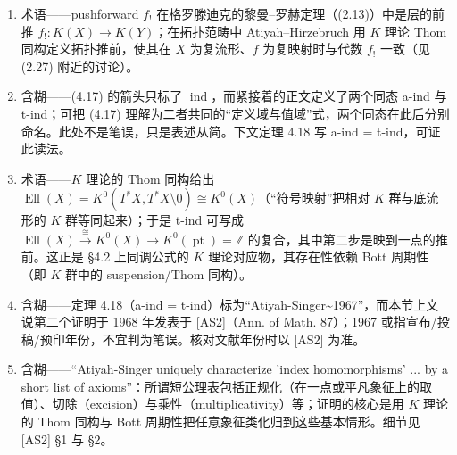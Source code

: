 \documentclass[11pt]{amsart}
\theoremstyle{definition}
\theoremstyle{remark}
\theoremstyle{plain}
\numberwithin{equation}{section}
\renewcommand{\:}{\colon}
\DeclareMathOperator{\pt}{pt}
\newcommand{\ZZ}{{\mathbb Z}}
\DeclareMathOperator{\ind}{ind}
\DeclareMathOperator{\Ell}{Ell}
\begin{document}
\begin{enumerate}[leftmargin=2.2em,itemsep=2pt,topsep=2pt]
  \item 术语——pushforward $f_!$ 在格罗滕迪克的黎曼–罗赫定理（(2.13)）中是层的前推 $f_!:K(X)\to K(Y)$；在拓扑范畴中 Atiyah–Hirzebruch 用 $K$ 理论 Thom 同构定义拓扑推前，使其在 $X$ 为复流形、$f$ 为复映射时与代数 $f_!$ 一致（见 (2.27) 附近的讨论）。
  \item 含糊——(4.17) 的箭头只标了 $\ind$，而紧接着的正文定义了两个同态 a-ind 与 t-ind；可把 (4.17) 理解为二者共同的“定义域与值域”式，两个同态在此后分别命名。此处不是笔误，只是表述从简。下文定理 4.18 写 a-ind = t-ind，可证此读法。
  \item 术语——$K$ 理论的 Thom 同构给出 $\Ell(X)=K^0(T^*X,T^*X\setminus 0)\cong K^0(X)$（“符号映射”把相对 $K$ 群与底流形的 $K$ 群等同起来）；于是 t-ind 可写成 $\Ell(X)\xrightarrow{\cong}K^0(X)\to K^0(\pt)=\ZZ$ 的复合，其中第二步是映到一点的推前。这正是 §4.2 上同调公式的 $K$ 理论对应物，其存在性依赖 Bott 周期性（即 $K$ 群中的 suspension/Thom 同构）。
  \item 含糊——定理 4.18（a-ind = t-ind）标为“Atiyah-Singer\textasciitilde{}1967”，而本节上文说第二个证明于 1968 年发表于 [AS2]（Ann. of Math. 87）；1967 或指宣布/投稿/预印年份，不宜判为笔误。核对文献年份时以 [AS2] 为准。
  \item 含糊——“Atiyah-Singer uniquely characterize 'index homomorphisms' ... by a short list of axioms”：所谓短公理表包括正规化（在一点或平凡象征上的取值）、切除（excision）与乘性（multiplicativity）等；证明的核心是用 $K$ 理论的 Thom 同构与 Bott 周期性把任意象征类化归到这些基本情形。细节见 [AS2] §1 与 §2。
\end{enumerate}
\end{document}

